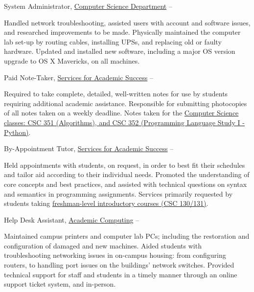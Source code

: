 \documentclass[letterpaper,MMMyyyy,nonstopmode]{simpleresumecv}
\begin{document}
\begin{Body}
\Gap

\Entry
System Administrator,
\href{http://cs.rocky.edu}
{Computer Science Department}
\hfill
{} --
\begin{Detail}
\BulletItem
Handled network troubleshooting, assisted users with account and software issues, and researched improvements to be made.
\BulletItem
Physically maintained the computer lab set-up by routing cables, installing UPSs, and replacing old or faulty hardware.
\BulletItem
Updated and installed new software, including a major OS version upgrade to OS X Mavericks, on all machines.
\end{Detail}

\Gap

\Entry
Paid Note-Taker,
\href{https://www.rocky.edu/student-life/student-support/academic-support/ServicesAcademicSuccess.php}
{Services for Academic Success}
\hfill
{} --
\begin{Detail}
\BulletItem
Required to take complete, detailed, well-written notes for use by students requiring additional academic assistance.
\BulletItem
Responsible for submitting photocopies of all notes taken on a weekly deadline.
\BulletItem
Notes taken for the \href{https://www.rocky.edu/academics/catalog/program/9/Computer_Science#courses-content}{Computer Science classes: CSC 351 (Algorithms), and CSC 352 (Programming Language Study I - Python)}.
\end{Detail}

\Gap

\Entry
By-Appointment Tutor,
\href{https://www.rocky.edu/student-life/student-support/academic-support/ServicesAcademicSuccess.php}
{Services for Academic Success}
\hfill
{} --
\begin{Detail}
\BulletItem
Held appointments with students, on request, in order to best fit their schedules and tailor aid according to their individual needs.
\BulletItem
Promoted the understanding of core concepts and best practices, and assisted with technical questions on syntax and semantics in programming assignments.
\BulletItem
Services primarily requested by students taking \href{https://www.rocky.edu/academics/catalog/program/9/Computer_Science#courses-content}{freshman-level introductory courses (CSC 130/131)}.
\end{Detail}

\Gap

\Entry
Help Desk Assistant,
\href{https://rocky.edu/student-life/student-support/academic-computing/}
{Academic Computing}
\hfill
{} --
\begin{Detail}
\BulletItem
Maintained campus printers and computer lab PCs; including the restoration and configuration of damaged and new machines.
\BulletItem
Aided students with troubleshooting networking issues in on-campus housing: from configuring routers, to handling port issues on the buildings' network switches.
\BulletItem
Provided technical support for staff and students in a timely manner through an online support ticket system, and in-person.
\end{Detail}


\end{Body}
\end{document}
